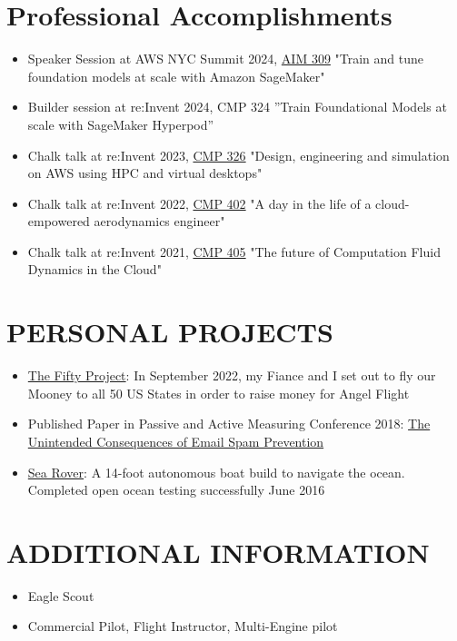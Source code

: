 \documentclass{res}
\begin{document}
\begin{resume}
\section{Professional Accomplishments}    
	\begin{itemize}
   	\setlength\itemsep{0em}
        \item Speaker Session at AWS NYC Summit 2024, \href{https://swsmith.cc/slides/aim309-slides.pdf}{AIM 309} "Train and tune foundation models at scale with Amazon SageMaker"
        \item Builder session at re:Invent 2024, CMP 324 ”Train Foundational Models at scale with SageMaker Hyperpod”
        \item Chalk talk at re:Invent 2023, \href{https://swsmith.cc/slides/cmp326-RES.pdf}{CMP 326} "Design, engineering and simulation on AWS using HPC and virtual desktops"
        \item Chalk talk at re:Invent 2022, \href{https://swsmith.cc/slides/cmp402-slides.pdf}{CMP 402} "A day in the life of a cloud-empowered aerodynamics engineer"
        \item Chalk talk at re:Invent 2021, \href{https://swsmith.cc/slides/cmp405-slides.pdf}{CMP 405} "The future of Computation Fluid Dynamics in the Cloud"
        \end{itemize}
\vspace{-0.10in}
\section{PERSONAL PROJECTS}    
	\begin{itemize}
   	\setlength\itemsep{0em}   
         \item \href{https://thefiftyproject.com/}{The Fifty Project}: In September 2022, my Fiance and I set out to fly our Mooney to all 50 US States in order to raise money for Angel Flight
  		 \item Published Paper in Passive and Active Measuring Conference 2018: \href{https://www.cs.huji.ac.il/~yossigi/pam18.pdf}{The Unintended Consequences of Email Spam Prevention}
         \item \href{https://www.kickstarter.com/projects/bdommie/sea-rover}{Sea Rover}: A 14-foot autonomous boat build to navigate the ocean. Completed open ocean testing successfully June 2016
    		\end{itemize}
\vspace{-0.10in}
    \section{ADDITIONAL INFORMATION} 
    	\begin{itemize}
	\setlength\itemsep{0em}
  		\item Eagle Scout  
  		\item Commercial Pilot, Flight Instructor, Multi-Engine pilot
	\end{itemize}           
 
\end{resume}
\end{document}
